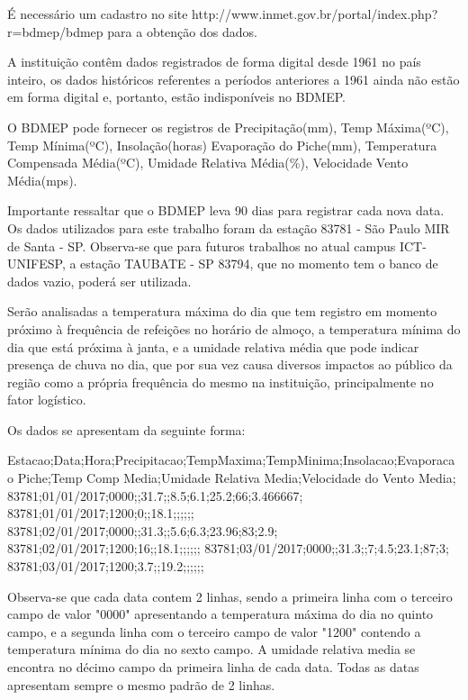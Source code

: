 \documentclass[	12pt, Times, openright, twoside, a4paper, english, brazil]{abntex2}
\begin{document}
          É necessário um cadastro no site http://www.inmet.gov.br/portal/index.php?r=bdmep/bdmep para a obtenção dos dados. 

          A instituição contêm dados registrados de forma digital desde 1961 no país inteiro, os dados históricos referentes a períodos anteriores a 1961 ainda não estão em forma digital e, portanto, estão indisponíveis no BDMEP.

          O BDMEP pode fornecer os registros de Precipitação(mm), Temp Máxima(ºC), Temp Mínima(ºC), Insolação(horas)
          Evaporação do Piche(mm), Temperatura Compensada Média(ºC), Umidade Relativa Média(\%), Velocidade Vento Média(mps).

          Importante ressaltar que o BDMEP leva 90 dias para registrar cada nova data.
          Os dados utilizados para este trabalho foram da estação 83781 - São Paulo MIR de Santa - SP.
          Observa-se que para futuros trabalhos no atual campus ICT-UNIFESP, a estação TAUBATE - SP 83794, que no momento tem o banco de dados vazio, poderá ser utilizada.

          Serão analisadas a temperatura máxima do dia que tem registro em momento próximo à frequência de refeições no horário de almoço, a temperatura mínima do dia que está próxima à janta, e a umidade relativa média que pode indicar presença de chuva no dia, que por sua vez causa diversos impactos ao público da região como a própria frequência do mesmo na instituição, principalmente no fator logístico. 

          Os dados se apresentam da seguinte forma:\\
          \begin{algorithm}[H]
          Estacao;Data;Hora;Precipitacao;TempMaxima;TempMinima;Insolacao;Evaporacao Piche;Temp Comp Media;Umidade Relativa Media;Velocidade do Vento Media;
          83781;01/01/2017;0000;;31.7;;8.5;6.1;25.2;66;3.466667;
          83781;01/01/2017;1200;0;;18.1;;;;;;
          83781;02/01/2017;0000;;31.3;;5.6;6.3;23.96;83;2.9;
          83781;02/01/2017;1200;16;;18.1;;;;;;
          83781;03/01/2017;0000;;31.3;;7;4.5;23.1;87;3;
          83781;03/01/2017;1200;3.7;;19.2;;;;;;
          \end{algorithm}

          Observa-se que cada data contem 2 linhas, sendo a primeira linha com o terceiro campo de valor "0000" apresentando a temperatura máxima do dia no quinto campo, e a segunda linha com o terceiro campo de valor "1200" contendo a temperatura mínima do dia no sexto campo.
          A umidade relativa media se encontra no décimo campo da primeira linha de cada data.
          Todas as datas apresentam sempre o mesmo padrão de 2 linhas.
          
\end{document}
